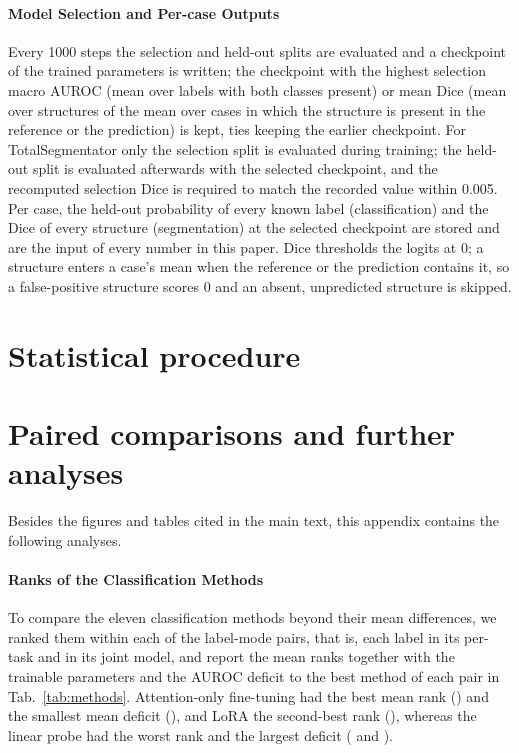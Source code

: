 \paragraph{Model Selection and Per-case Outputs} Every 1000 steps the selection and held-out splits are evaluated and a checkpoint of the trained parameters is written; the checkpoint with the highest selection macro AUROC (mean over labels with both classes present) or mean Dice (mean over structures of the mean over cases in which the structure is present in the reference or the prediction) is kept, ties keeping the earlier checkpoint. For TotalSegmentator only the selection split is evaluated during training; the held-out split is evaluated afterwards with the selected checkpoint, and the recomputed selection Dice is required to match the recorded value within 0.005. Per case, the held-out probability of every known label (classification) and the Dice of every structure (segmentation) at the selected checkpoint are stored and are the input of every number in this paper. Dice thresholds the logits at 0; a structure enters a case's mean when the reference or the prediction contains it, so a false-positive structure scores 0 and an absent, unpredicted structure is skipped.

\clearpage
\section{Statistical procedure}
\label{app:stats}


\clearpage
\section{Paired comparisons and further analyses}
\label{app:paired}

Besides the figures and tables cited in the main text, this appendix contains the following analyses.

\paragraph{Ranks of the Classification Methods} To compare the eleven classification methods beyond their mean differences, we ranked them within each of the \numRankSlotsN{} label-mode pairs, that is, each label in its per-task and in its joint model, and report the mean ranks together with the trainable parameters and the AUROC deficit to the best method of each pair in Tab.~\ref{tab:methods}. Attention-only fine-tuning had the best mean rank (\numRankAttnftMean{}) and the smallest mean deficit (\numRegretAttnft{}), and LoRA the second-best rank (\numRankLoraMean{}), whereas the linear probe had the worst rank and the largest deficit (\numRankLinMean{} and \numRegretLin{}).

